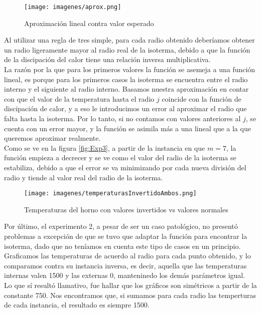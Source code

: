 \begin{wrapfigure}{l}{0.5\textwidth}
  \vspace{-20pt}
  \begin{center}
    \texttt{[image: imagenes/aprox.png]}
  \end{center}
  \vspace{-20pt}
  \caption{Aproximación lineal contra valor esperado}
  \vspace{-10pt}
  \label{fig:aproximacion}
\end{wrapfigure}

Al utilizar una regla de tres simple, para cada radio obtenido deberíamos obtener un radio ligeramente mayor al radio real de la isoterma, debido a que la función de la discipación del calor tiene una relación inversa multiplicativa.\\
La razón por la que para los primeros valores la función se asemeja a una función lineal, es porque para los primeros casos la isoterma se encuentra entre el radio interno y el siguiente al radio interno. Basamos nuestra aproximación en contar con que el valor de la temperatura hasta el radio $j$ coincide con la función de discipación de calor, y a eso le introducimos un error al aproximar el radio que falta hasta la isoterma. Por lo tanto, si no contamos con valores anteriores al $j$, se cuenta con un error mayor, y la función se asimila más a una lineal que a la que queremos aproximar realmente.\\
Como se ve en la figura \ref{fig:Exp3}, a partir de la instancia en que $m=7$, la función empieza a decrecer y se ve como el valor del radio de la isoterma se estabiliza, debido a que el error se va minimizando por cada nueva división del radio y tiende al valor real del radio de la isoterma. \\

\begin{wrapfigure}{r}{0.5\textwidth}
  \vspace{-20pt}
  \begin{center}
    \texttt{[image: imagenes/temperaturasInvertidoAmbos.png]}
  \end{center}
  \vspace{-20pt}
  \caption{Temperaturas del horno con valores invertidos vs valores normales}
  \vspace{-10pt}
  \label{fig:aproximacion}
\end{wrapfigure}

Por último, el experimento 2, a pesar de ser un caso patológico, no presentó problemas a excepción de que se tuvo que adaptar la función para encontrar la isoterma, dado que no teníamos en cuenta este tipo de casos en un principio. Graficamos las temperaturas de acuerdo al radio para cada punto obtenido, y lo comparamos contra su instancia inversa, es decir, aquella que las temperaturas internas valen 1500 y las externas 0, manteninedo los demás parámetros igual. \\
Lo que sí resultó llamativo, fue hallar que los gráficos son simétricos a partir de la constante 750. Nos encontramos que, si sumamos para cada radio las temperturas de cada instancia, el resultado es siempre 1500. 

